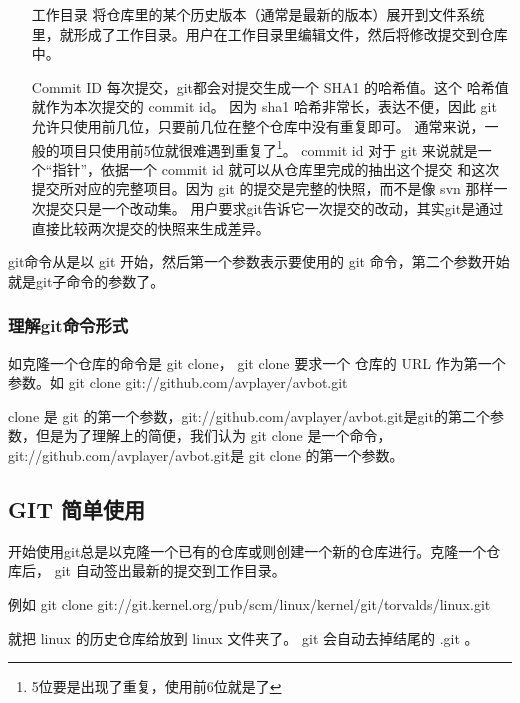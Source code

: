 \begin{enumerate}
\item[工作目录]	 将仓库里的某个历史版本（通常是最新的版本）展开到文件系统里，就形成了工作目录。用户在工作目录里编辑文件，然后将修改提交到仓库中。

\item[Commit ID] 每次提交，git都会对提交生成一个 SHA1 的哈希值。这个 哈希值就作为本次提交的 commit id。
		因为 sha1 哈希非常长，表达不便，因此 git 允许只使用前几位，只要前几位在整个仓库中没有重复即可。
		通常来说，一般的项目只使用前5位就很难遇到重复了\footnote{5位要是出现了重复，使用前6位就是了}。
		commit id 对于 git 来说就是一个“指针”，依据一个 commit id 就可以从仓库里完成的抽出这个提交
		和这次提交所对应的完整项目。因为 git 的提交是完整的快照，而不是像 svn 那样一次提交只是一个改动集。
		用户要求git告诉它一次提交的改动，其实git是通过直接比较两次提交的快照来生成差异。


\end{enumerate}

git命令从是以 git 开始，然后第一个参数表示要使用的 git 命令，第二个参数开始就是git子命令的参数了。

\subsubsection*{理解git命令形式}
如克隆一个仓库的命令是 git clone， git clone 要求一个 仓库的 URL 作为第一个参数。如 git clone git://github.com/avplayer/avbot.git

clone 是 git 的第一个参数，git://github.com/avplayer/avbot.git是git的第二个参数，但是为了理解上的简便，我们认为 git clone 是一个命令， git://github.com/avplayer/avbot.git是 git clone 的第一个参数。
 
\subsection{GIT 简单使用}

开始使用git总是以克隆一个已有的仓库或则创建一个新的仓库进行。克隆一个仓库后， git 自动签出最新的提交到工作目录。

例如 git clone git://git.kernel.org/pub/scm/linux/kernel/git/torvalds/linux.git

就把 linux 的历史仓库给放到 linux 文件夹了。 git 会自动去掉结尾的 .git 。





